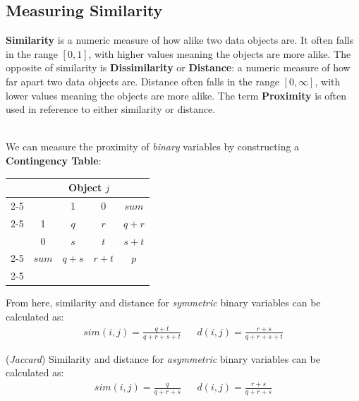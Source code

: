 \documentclass[12pt]{article}
\begin{document}
\subsection{Measuring Similarity}
\textbf{Similarity} is a numeric measure of how alike two data objects are. It often falls in the range $[0, 1]$, with higher values meaning the objects are more alike.
The opposite of similarity is \textbf{Dissimilarity} or \textbf{Distance}: a numeric measure of how far apart two data objects are.
Distance often falls in the range $[0, \infty]$, with lower values meaning the objects are more alike.
The term \textbf{Proximity} is often used in reference to either similarity or distance.

\noindent
\\
We can measure the proximity of \textit{binary} variables by constructing a \textbf{Contingency Table}:

\begin{table}[h]
    \centering
    \begin{tabular}{ccccc}
         & \multicolumn{4}{c}{Object $j$} \\ \cline{2-5} 
        \multicolumn{1}{c|}{\multirow{4}{*}{Object $i$}} & \multicolumn{1}{c|}{} & 1 & \multicolumn{1}{c|}{0} & \multicolumn{1}{c|}{$sum$} \\ \cline{2-5} 
        \multicolumn{1}{c|}{} & \multicolumn{1}{c|}{1} & $q$ & \multicolumn{1}{c|}{$r$} & \multicolumn{1}{c|}{$q+r$} \\
        \multicolumn{1}{c|}{} & \multicolumn{1}{c|}{0} & $s$ & \multicolumn{1}{c|}{$t$} & \multicolumn{1}{c|}{$s+t$} \\ \cline{2-5} 
        \multicolumn{1}{c|}{} & \multicolumn{1}{c|}{$sum$} & $q+s$ & \multicolumn{1}{c|}{$r+t$} & \multicolumn{1}{c|}{$p$} \\ \cline{2-5} 
    \end{tabular}
\end{table}

\noindent
From here, similarity and distance for \textit{symmetric} binary variables can be calculated as:
\begin{align*}
    sim(i, j) = \frac{q + t}{q + r + s + t} && d(i, j) = \frac{r + s}{q + r + s + t}
\end{align*}

\noindent
(\textit{Jaccard}) Similarity and distance for \textit{asymmetric} binary variables can be calculated as:
\begin{align*}
    sim(i, j) = \frac{q}{q + r + s} && d(i, j) = \frac{r + s}{q + r + s}
\end{align*}
\end{document}
